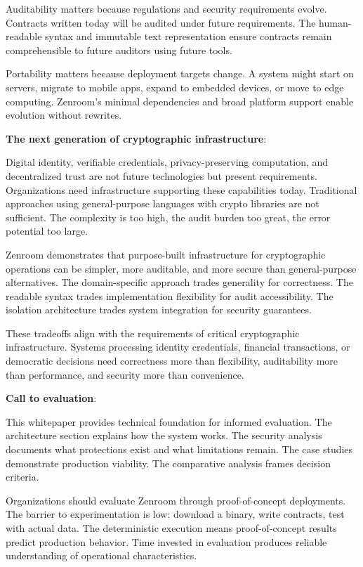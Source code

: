 Auditability matters because regulations and security requirements
evolve. Contracts written today will be audited under future
requirements. The human-readable syntax and immutable text
representation ensure contracts remain comprehensible to future
auditors using future tools.

Portability matters because deployment targets change. A system might
start on servers, migrate to mobile apps, expand to embedded devices,
or move to edge computing. Zenroom's minimal dependencies and broad
platform support enable evolution without rewrites.

\textbf{The next generation of cryptographic infrastructure}:

Digital identity, verifiable credentials, privacy-preserving
computation, and decentralized trust are not future technologies but
present requirements. Organizations need infrastructure supporting
these capabilities today. Traditional approaches using general-purpose
languages with crypto libraries are not sufficient. The complexity is
too high, the audit burden too great, the error potential too large.

Zenroom demonstrates that purpose-built infrastructure for
cryptographic operations can be simpler, more auditable, and more
secure than general-purpose alternatives. The domain-specific approach
trades generality for correctness. The readable syntax trades
implementation flexibility for audit accessibility. The isolation
architecture trades system integration for security guarantees.

These tradeoffs align with the requirements of critical cryptographic
infrastructure. Systems processing identity credentials, financial
transactions, or democratic decisions need correctness more than
flexibility, auditability more than performance, and security more
than convenience.

\textbf{Call to evaluation}:

This whitepaper provides technical foundation for informed
evaluation. The architecture section explains how the system
works. The security analysis documents what protections exist and what
limitations remain. The case studies demonstrate production
viability. The comparative analysis frames decision criteria.

Organizations should evaluate Zenroom through proof-of-concept
deployments. The barrier to experimentation is low: download a binary,
write contracts, test with actual data. The deterministic execution
means proof-of-concept results predict production behavior. Time
invested in evaluation produces reliable understanding of operational
characteristics.

